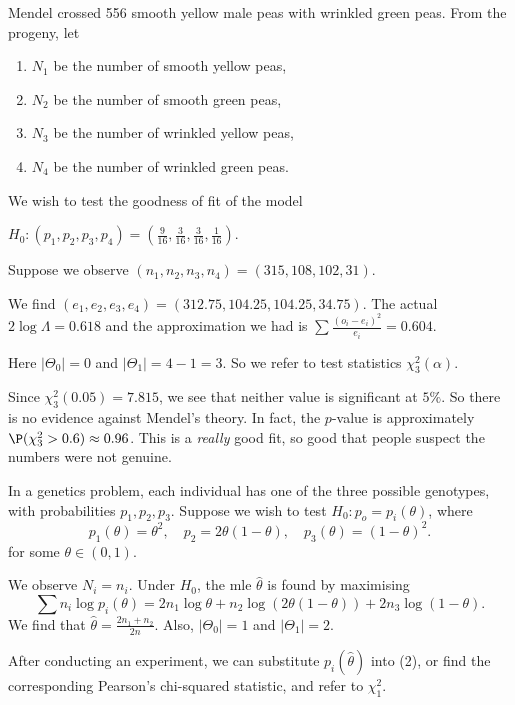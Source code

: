 \documentclass[a4paper]{article}
\begin{document}
\begin{eg}
  Mendel crossed 556 smooth yellow male peas with wrinkled green peas. From the progeny, let
  \begin{enumerate}
    \item $N_1$ be the number of smooth yellow peas,
    \item $N_2$ be the number of smooth green peas,
    \item $N_3$ be the number of wrinkled yellow peas,
    \item $N_4$ be the number of wrinkled green peas.
  \end{enumerate}
  We wish to test the goodness of fit of the model
  \begin{center}
    $H_0: (p_1, p_2, p_3, p_4) = \left(\frac{9}{16}, \frac{3}{16}, \frac{3}{16}, \frac{1}{16}\right)$.
  \end{center}
  Suppose we observe $(n_1, n_2, n_3, n_4) = (315, 108, 102, 31)$.

  We find $(e_1, e_2, e_3, e_4) = (312.75, 104.25, 104.25, 34.75)$. The actual $2\log \Lambda = 0.618$ and the approximation we had is $\sum \frac{(o_i - e_i)^2}{e_i} = 0.604$.

  Here $|\Theta_0| = 0$ and $|\Theta_1| = 4 - 1 = 3$. So we refer to test statistics $\chi_3^2(\alpha)$.

  Since $\chi_3^2(0.05) = 7.815$, we see that neither value is significant at $5\%$. So there is no evidence against Mendel's theory. In fact, the $p$-value is approximately $\P(\chi_3^2 > 0.6) \approx 0.96$. This is a \emph{really} good fit, so good that people suspect the numbers were not genuine.
\end{eg}

\begin{eg}
  In a genetics problem, each individual has one of the three possible genotypes, with probabilities $p_1, p_2, p_3$. Suppose we wish to test $H_0: p_o = p_i(\theta)$, where
  \[
    p_1(\theta) = \theta^2,\quad p_2 = 2\theta(1 - \theta), \quad p_3(\theta) = (1 - \theta)^2.
  \]
  for some $\theta \in (0, 1)$.

  We observe $N_i = n_i$. Under $H_0$, the mle $\hat{\theta}$ is found by maximising
  \[
    \sum n_i \log p_i(\theta) = 2n_1 \log \theta + n_2\log(2\theta(1 - \theta)) + 2n_3 \log (1 - \theta).
  \]
  We find that $\hat{\theta} = \frac{2n_1 + n_2}{2n}$. Also, $|\Theta_0| = 1$ and $|\Theta_1| = 2$.

  After conducting an experiment, we can substitute $p_i(\hat{\theta})$ into (2), or find the corresponding Pearson's chi-squared statistic, and refer to $\chi_1^2$.
\end{eg}
\end{document}
